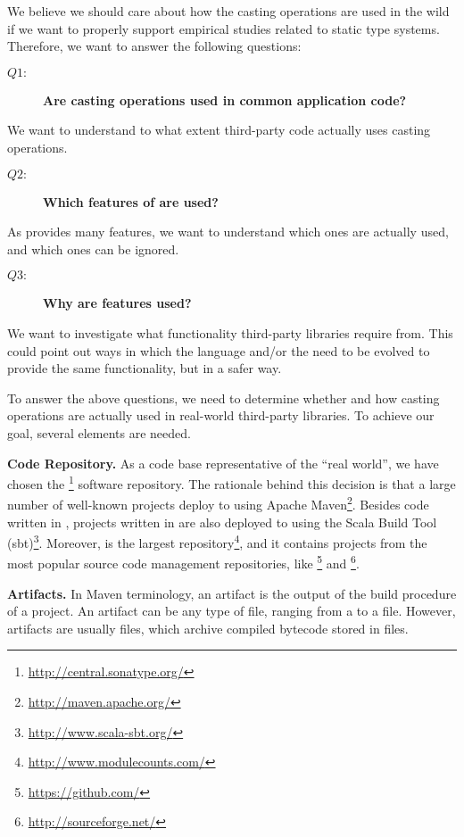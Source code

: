 We believe we should care about how the casting operations are used in the wild if we want to properly support empirical studies related to static type systems. 
Therefore, we want to answer the following questions: 

\begin{description}
\item[{\(Q1:\)}] \textbf{Are casting operations used in common application code?}
\end{description}
We want to understand to what extent third-party code actually uses casting operations. 

\begin{description}
\item[{\(Q2:\)}] \textbf{Which features of  are used?}
\end{description}
As provides many features, we want to understand which ones are actually used, and which ones can be ignored. 

\begin{description}
\item[{\(Q3:\)}] \textbf{Why are features used?}
\end{description}
We want to investigate what functionality third-party libraries require from. 
This could point out ways in which the \java{} language and/or the \jvm{} need to be evolved to provide the same functionality, but in a safer way.   

To answer the above questions, we need to determine whether and how casting operations are actually used in real-world third-party \java{} libraries. 
To achieve our goal, several elements are needed. 

\textbf{Code Repository.} 
As a code base representative of the ``real world'', we have chosen the \mavencentral \footnote{\url{http://central.sonatype.org/}} software repository. 
The rationale behind this decision is that a large number of well-known \java{} projects deploy to \mavencentral{} using Apache Maven\footnote{\url{http://maven.apache.org/}}. 
Besides code written in \java{}, projects written in \scala{} are also deployed to \mavencentral{} using the Scala Build Tool (sbt)\footnote{\url{http://www.scala-sbt.org/}}. 
Moreover, \mavencentral{} is the largest \java{} repository\footnote{\url{http://www.modulecounts.com/}}, and it contains projects from the most popular source code management repositories, like \github \footnote{\url{https://github.com/}} and \sourceforge \footnote{\url{http://sourceforge.net/}}. 

\textbf{Artifacts.} 
In Maven terminology, an artifact is the output of the build procedure of a project. 
An artifact can be any type of file, ranging from a  to a  file. 
However, artifacts are usually  files, which archive compiled \java{} bytecode stored in  files. 

